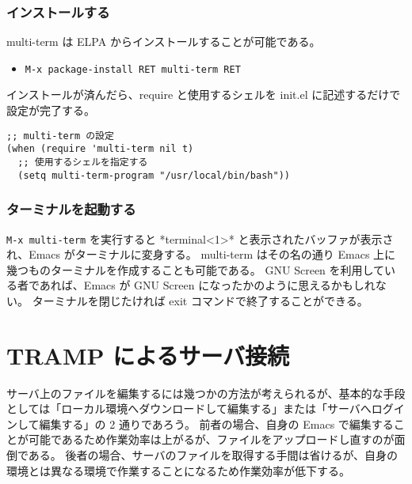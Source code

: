 \subsubsection{インストールする}
multi-term は ELPA からインストールすることが可能である。
\begin{itemize}\setlength{\leftskip}{-1.00zw}%
\item[] \texttt{M-x package-install RET multi-term RET}
\end{itemize}
インストールが済んだら、require と使用するシェルを init.el に記述するだけで設定が完了する。
\begin{mdframed}[roundcorner=0.50zw,leftmargin=3.00zw,rightmargin=3.00zw,skipabove=0.40zw,skipbelow=0.40zw,innertopmargin=4.00pt,innerbottommargin=4.00pt,innerleftmargin=5.00pt,innerrightmargin=5.00pt,linecolor=gray!020,linewidth=0.50pt,backgroundcolor=gray!20]
\begin{verbatim}
;; multi-term の設定
(when (require 'multi-term nil t)
  ;; 使用するシェルを指定する
  (setq multi-term-program "/usr/local/bin/bash"))
\end{verbatim}
\end{mdframed}
\subsubsection{ターミナルを起動する}
\texttt{M-x multi-term} を実行すると *terminal<1>* と表示されたバッファが表示され、Emacs がターミナルに変身する。
multi-term はその名の通り Emacs 上に幾つものターミナルを作成することも可能である。
GNU Screen を利用している者であれば、Emacs が GNU Screen になったかのように思えるかもしれない。
ターミナルを閉じたければ exit コマンドで終了することができる。
\section{TRAMP によるサーバ接続}
サーバ上のファイルを編集するには幾つかの方法が考えられるが、基本的な手段としては「ローカル環境へダウンロードして編集する」または「サーバへログインして編集する」の 2 通りであろう。
前者の場合、自身の Emacs で編集することが可能であるため作業効率は上がるが、ファイルをアップロードし直すのが面倒である。
後者の場合、サーバのファイルを取得する手間は省けるが、自身の環境とは異なる環境で作業することになるため作業効率が低下する。\\

